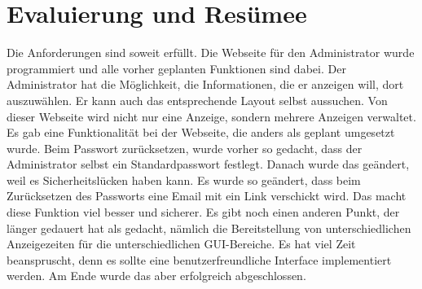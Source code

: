 \section{Evaluierung und Resümee}

Die Anforderungen sind soweit erfüllt. Die Webseite f\"ur den Administrator  wurde programmiert und alle vorher geplanten Funktionen sind dabei. Der Administrator hat die Möglichkeit, die Informationen, die er anzeigen will, dort auszuwählen. Er kann auch das entsprechende Layout selbst aussuchen. Von dieser Webseite wird nicht nur eine Anzeige, sondern mehrere Anzeigen verwaltet. Es gab eine Funktionalität bei der Webseite, die anders als geplant umgesetzt wurde. Beim Passwort zurücksetzen, wurde vorher so gedacht, dass der Administrator selbst ein Standardpasswort festlegt. Danach wurde das geändert, weil es Sicherheitslücken haben kann. Es wurde so geändert, dass beim Zurücksetzen des Passworts eine Email mit ein Link verschickt wird. Das macht diese Funktion viel besser und sicherer. Es gibt noch einen anderen Punkt, der länger gedauert hat als gedacht, n\"amlich die Bereitstellung von unterschiedlichen Anzeigezeiten für die unterschiedlichen GUI-Bereiche. Es hat viel Zeit beanspruscht, denn es sollte eine benutzerfreundliche Interface implementiert werden. Am Ende wurde das aber erfolgreich abgeschlossen.
